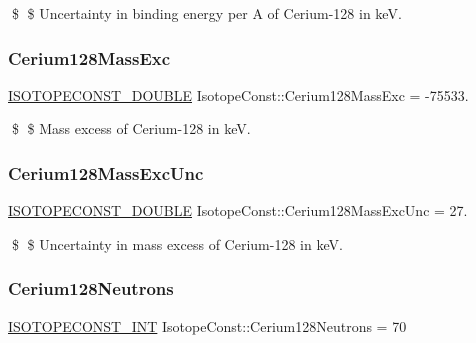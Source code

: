 \$ \$ Uncertainty in binding energy per A of Cerium-\/128 in keV. \mbox{\label{group___isotope_const-_cerium-_ce128_ga77b3c627c266f37a99aa237b679ea11e}} 
\subsubsection{\texorpdfstring{Cerium128\+Mass\+Exc}{Cerium128MassExc}}
{\footnotesize\ttfamily \mbox{\hyperlink{group___isotope_const-_macros_ga8f45a7272ce02c0b4c65c44636ed719a}{I\+S\+O\+T\+O\+P\+E\+C\+O\+N\+S\+T\+\_\+\+D\+O\+U\+B\+LE}} Isotope\+Const\+::\+Cerium128\+Mass\+Exc = -\/75533.}

\$ \$ Mass excess of Cerium-\/128 in keV. \mbox{\label{group___isotope_const-_cerium-_ce128_ga766863054eff84b7ddb4eb1d6d54c265}} 
\subsubsection{\texorpdfstring{Cerium128\+Mass\+Exc\+Unc}{Cerium128MassExcUnc}}
{\footnotesize\ttfamily \mbox{\hyperlink{group___isotope_const-_macros_ga8f45a7272ce02c0b4c65c44636ed719a}{I\+S\+O\+T\+O\+P\+E\+C\+O\+N\+S\+T\+\_\+\+D\+O\+U\+B\+LE}} Isotope\+Const\+::\+Cerium128\+Mass\+Exc\+Unc = 27.}

\$ \$ Uncertainty in mass excess of Cerium-\/128 in keV. \mbox{\label{group___isotope_const-_cerium-_ce128_ga928458304640fffc143570f909731961}} 
\subsubsection{\texorpdfstring{Cerium128\+Neutrons}{Cerium128Neutrons}}
{\footnotesize\ttfamily \mbox{\hyperlink{group___isotope_const-_macros_ga5f18360b3e99483a35c32d789e62621c}{I\+S\+O\+T\+O\+P\+E\+C\+O\+N\+S\+T\+\_\+\+I\+NT}} Isotope\+Const\+::\+Cerium128\+Neutrons = 70}

